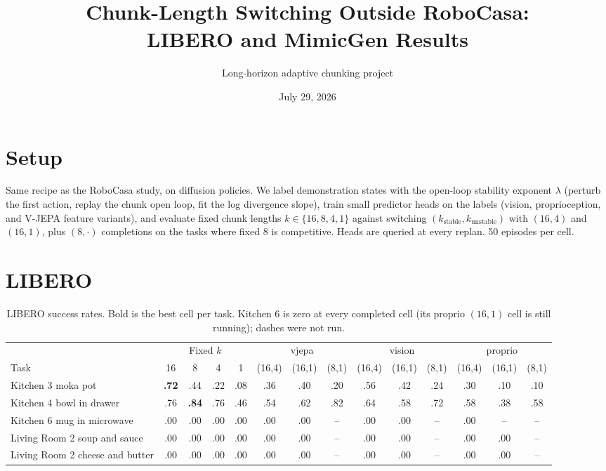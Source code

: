 \documentclass[11pt]{article}
\title{Chunk-Length Switching Outside RoboCasa:\\LIBERO and MimicGen Results}
\author{Long-horizon adaptive chunking project}
\date{July 29, 2026}
\begin{document}
\maketitle

\section*{Setup}
Same recipe as the RoboCasa study, on diffusion policies. We label
demonstration states with the open-loop stability exponent $\lambda$
(perturb the first action, replay the chunk open loop, fit the log
divergence slope), train small predictor heads on the labels (vision,
proprioception, and V-JEPA feature variants), and evaluate fixed chunk
lengths $k \in \{16, 8, 4, 1\}$ against switching $(k_{\text{stable}},
k_{\text{unstable}})$ with $(16,4)$ and $(16,1)$, plus $(8,\cdot)$
completions on the tasks where fixed 8 is competitive. Heads are queried at
every replan. 50 episodes per cell.

\section*{LIBERO}
\begin{table}[h]
\centering
\small
\setlength{\tabcolsep}{3.5pt}
\begin{tabular}{lccccccccccccc}
\toprule
& \multicolumn{4}{c}{Fixed $k$} & \multicolumn{3}{c}{vjepa} & \multicolumn{3}{c}{vision} & \multicolumn{3}{c}{proprio} \\
\cmidrule(lr){2-5}\cmidrule(lr){6-8}\cmidrule(lr){9-11}\cmidrule(lr){12-14}
Task & 16 & 8 & 4 & 1 & (16,4) & (16,1) & (8,1) & (16,4) & (16,1) & (8,1) & (16,4) & (16,1) & (8,1) \\
\midrule
Kitchen 3 moka pot   & \textbf{.72} & .44 & .22 & .08 & .36 & .40 & .20 & .56 & .42 & .24 & .30 & .10 & .10 \\
Kitchen 4 bowl in drawer & .76 & \textbf{.84} & .76 & .46 & .54 & .62 & .82 & .64 & .58 & .72 & .58 & .38 & .58 \\
Kitchen 6 mug in microwave & .00 & .00 & .00 & .00 & .00 & .00 & -- & .00 & .00 & -- & .00 & -- & -- \\
Living Room 2 soup and sauce & .00 & .00 & .00 & .00 & .00 & .00 & -- & .00 & .00 & -- & .00 & .00 & -- \\
Living Room 2 cheese and butter & .00 & .00 & .00 & .00 & .00 & .00 & -- & .00 & .00 & -- & .00 & .00 & -- \\
\bottomrule
\end{tabular}
\caption{LIBERO success rates. Bold is the best cell per task. Kitchen 6 is
zero at every completed cell (its proprio $(16,1)$ cell is still running);
dashes were not run.}
\end{table}
\end{document}
